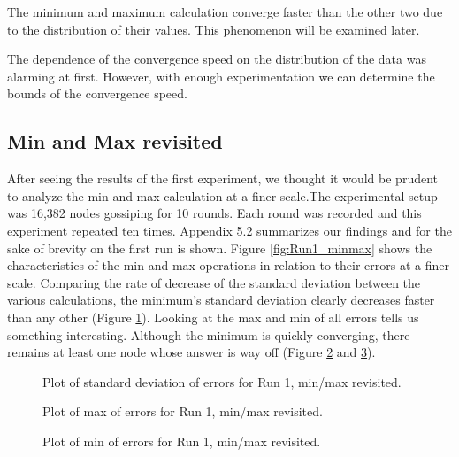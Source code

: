 The minimum and maximum calculation converge faster than the other two due to the distribution of their values. This phenomenon will be examined later.

The dependence of the convergence speed on the distribution of the data was alarming at first. However, with enough experimentation we can determine the bounds of the convergence speed. 

\subsection{Min and Max revisited}
After seeing the results of the first experiment, we thought it would be prudent to analyze the min and max calculation at a finer scale.The experimental setup was 16,382 nodes gossiping for 10 rounds. Each round was recorded and this experiment repeated ten times. Appendix 5.2 summarizes our findings and for the sake of brevity on the first run is shown. Figure \ref{fig:Run1_minmax} shows the characteristics of the min and max operations in relation to their errors at a finer scale. Comparing the rate of decrease of the standard deviation between the various calculations, the minimum's standard deviation clearly decreases faster than any other (Figure \ref{fig:Run1_stdev_minmax}). Looking at the max and min of all errors tells us something interesting. Although the minimum is quickly converging, there remains at least one node whose answer is way off (Figure \ref{fig:Run1_max_errors} and \ref{fig:Run1_min_errors}).


\begin{figure}[ht!]
\centering
\setlength\fboxsep{0pt}
\setlength\fboxrule{0.5pt}
\caption{Plot of standard deviation of errors for Run 1, min/max revisited.}
\label{fig:Run1_stdev_minmax}
\end{figure}

\begin{figure}[ht!]
\centering
\setlength\fboxsep{0pt}
\setlength\fboxrule{0.5pt}
\caption{Plot of max of errors for Run 1, min/max revisited.}
\label{fig:Run1_max_errors}
\end{figure}

\begin{figure}[ht!]
\centering
\setlength\fboxsep{0pt}
\setlength\fboxrule{0.5pt}
\caption{Plot of min of errors for Run 1, min/max revisited.}
\label{fig:Run1_min_errors}
\end{figure}

